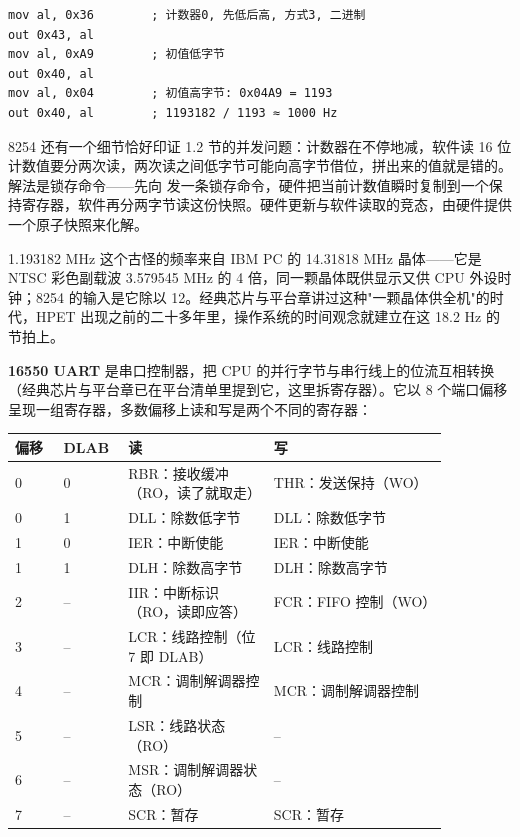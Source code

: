 \begin{lstlisting}
mov al, 0x36        ; 计数器0, 先低后高, 方式3, 二进制
out 0x43, al
mov al, 0xA9        ; 初值低字节
out 0x40, al
mov al, 0x04        ; 初值高字节: 0x04A9 = 1193
out 0x40, al        ; 1193182 / 1193 ≈ 1000 Hz
\end{lstlisting}

8254 还有一个细节恰好印证 1.2 节的并发问题：计数器在不停地减，软件读 16 位计数值要分两次读，两次读之间低字节可能向高字节借位，拼出来的值就是错的。解法是锁存命令——先向  发一条锁存命令，硬件把当前计数值瞬时复制到一个保持寄存器，软件再分两字节读这份快照。硬件更新与软件读取的竞态，由硬件提供一个原子快照来化解。

\begin{classicnote}
1.193182 MHz 这个古怪的频率来自 IBM PC 的 14.31818 MHz 晶体——它是 NTSC 彩色副载波 3.579545 MHz 的 4 倍，同一颗晶体既供显示又供 CPU 外设时钟；8254 的输入是它除以 12。经典芯片与平台章讲过这种"一颗晶体供全机"的时代，HPET 出现之前的二十多年里，操作系统的时间观念就建立在这 18.2 Hz 的节拍上。
\end{classicnote}

\textbf{16550 UART} 是串口控制器，把 CPU 的并行字节与串行线上的位流互相转换（经典芯片与平台章已在平台清单里提到它，这里拆寄存器）。它以 8 个端口偏移呈现一组寄存器，多数偏移上读和写是两个不同的寄存器：

\begin{longtable}{L{0.10\linewidth}L{0.10\linewidth}L{0.30\linewidth}L{0.36\linewidth}}
\toprule
偏移 & DLAB & 读 & 写 \\
 & 0 & RBR：接收缓冲（RO，读了就取走） & THR：发送保持（WO） \\
0 & 1 & DLL：除数低字节 & DLL：除数低字节 \\
1 & 0 & IER：中断使能 & IER：中断使能 \\
1 & 1 & DLH：除数高字节 & DLH：除数高字节 \\
2 & -- & IIR：中断标识（RO，读即应答） & FCR：FIFO 控制（WO） \\
3 & -- & LCR：线路控制（位 7 即 DLAB） & LCR：线路控制 \\
4 & -- & MCR：调制解调器控制 & MCR：调制解调器控制 \\
5 & -- & LSR：线路状态（RO） & -- \\
6 & -- & MSR：调制解调器状态（RO） & -- \\
7 & -- & SCR：暂存 & SCR：暂存 \\
\bottomrule
\end{longtable}

